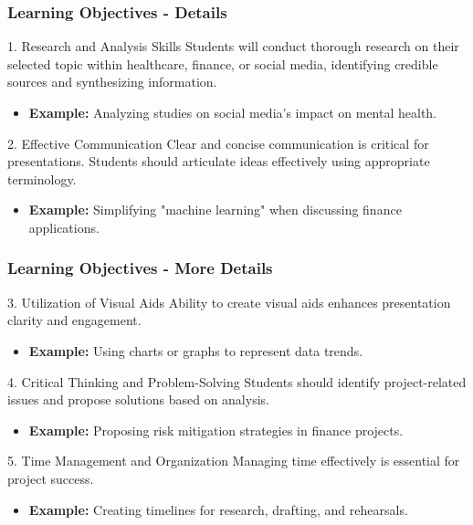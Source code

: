 \documentclass[aspectratio=169]{beamer}
\begin{document}
\begin{frame}[fragile]
    \frametitle{Learning Objectives - Details}
    \begin{block}{1. Research and Analysis Skills}
        Students will conduct thorough research on their selected topic within healthcare, finance, or social media, identifying credible sources and synthesizing information.
        \begin{itemize}
            \item \textbf{Example:} Analyzing studies on social media's impact on mental health.
        \end{itemize}
    \end{block}

    \begin{block}{2. Effective Communication}
        Clear and concise communication is critical for presentations. Students should articulate ideas effectively using appropriate terminology.
        \begin{itemize}
            \item \textbf{Example:} Simplifying "machine learning" when discussing finance applications.
        \end{itemize}
    \end{block}
\end{frame}

\begin{frame}[fragile]
    \frametitle{Learning Objectives - More Details}
    \begin{block}{3. Utilization of Visual Aids}
        Ability to create visual aids enhances presentation clarity and engagement.
        \begin{itemize}
            \item \textbf{Example:} Using charts or graphs to represent data trends.
        \end{itemize}
    \end{block}

    \begin{block}{4. Critical Thinking and Problem-Solving}
        Students should identify project-related issues and propose solutions based on analysis.
        \begin{itemize}
            \item \textbf{Example:} Proposing risk mitigation strategies in finance projects.
        \end{itemize}
    \end{block}

    \begin{block}{5. Time Management and Organization}
        Managing time effectively is essential for project success.
        \begin{itemize}
            \item \textbf{Example:} Creating timelines for research, drafting, and rehearsals.
        \end{itemize}
    \end{block}
\end{frame}
\end{document}
